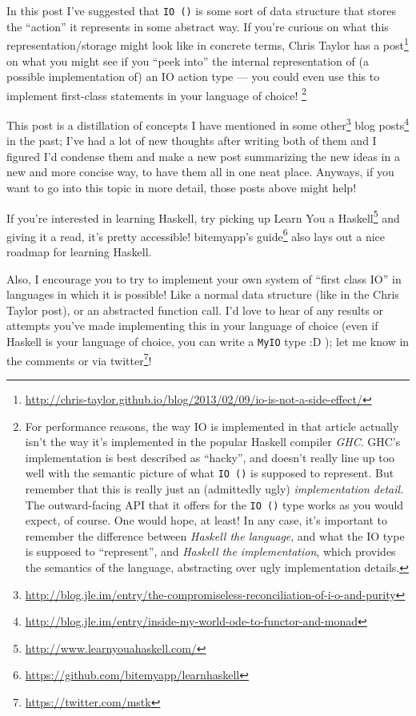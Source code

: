 \documentclass[]{article}
\renewcommand{\href}[2]{#2\footnote{\url{#1}}}
\begin{document}
In this post I've suggested that \texttt{IO\ ()} is some sort of data structure
that stores the ``action'' it represents in some abstract way. If you're curious
on what this representation/storage might look like in concrete terms,
\href{http://chris-taylor.github.io/blog/2013/02/09/io-is-not-a-side-effect/}{Chris
Taylor has a post} on what you might see if you ``peek into'' the internal
representation of (a possible implementation of) an IO action type --- you could
even use this to implement first-class statements in your language of choice!
\footnote{For performance reasons, the way IO is implemented in that article
  actually isn't the way it's implemented in the popular Haskell compiler
  \emph{GHC}. GHC's implementation is best described as ``hacky'', and doesn't
  really line up too well with the semantic picture of what \texttt{IO\ ()} is
  supposed to represent. But remember that this is really just an (admittedly
  ugly) \emph{implementation detail}. The outward-facing API that it offers for
  the \texttt{IO\ ()} type works as you would expect, of course. One would hope,
  at least! In any case, it's important to remember the difference between
  \emph{Haskell the language}, and what the IO type is supposed to
  ``represent'', and \emph{Haskell the implementation}, which provides the
  semantics of the language, abstracting over ugly implementation details.}

This post is a distillation of concepts I have mentioned in
\href{http://blog.jle.im/entry/the-compromiseless-reconciliation-of-i-o-and-purity}{some
other}
\href{http://blog.jle.im/entry/inside-my-world-ode-to-functor-and-monad}{blog
posts} in the past; I've had a lot of new thoughts after writing both of them
and I figured I'd condense them and make a new post summarizing the new ideas in
a new and more concise way, to have them all in one neat place. Anyways, if you
want to go into this topic in more detail, those posts above might help!

If you're interested in learning Haskell, try picking up
\href{http://www.learnyouahaskell.com/}{Learn You a Haskell} and giving it a
read, it's pretty accessible!
\href{https://github.com/bitemyapp/learnhaskell}{bitemyapp's guide} also lays
out a nice roadmap for learning Haskell.

Also, I encourage you to try to implement your own system of ``first class IO''
in languages in which it is possible! Like a normal data structure (like in the
Chris Taylor post), or an abstracted function call. I'd love to hear of any
results or attempts you've made implementing this in your language of choice
(even if Haskell is your language of choice, you can write a \texttt{MyIO} type
:D ); let me know in the comments or via
\href{https://twitter.com/mstk}{twitter}!
\end{document}
